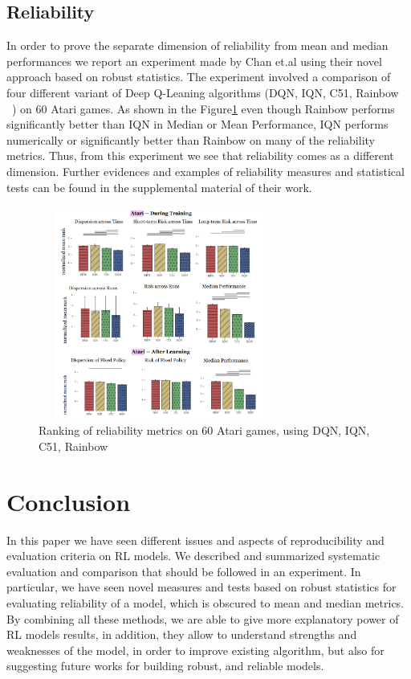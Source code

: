 \documentclass{article}
\begin{document}
\subsection{Reliability}
In order to prove the separate dimension of reliability from mean and median performances we report an experiment made by Chan et.al using their novel approach based on robust statistics. The experiment involved a comparison of four different variant of Deep Q-Leaning algorithms (DQN, IQN, C51, Rainbow ~\cite{DQN, IQN, C51,Rainbow}) on 60 Atari games. As shown in the Figure\ref{fig:realibility} even though Rainbow performs significantly better than IQN in Median or Mean Performance, IQN performs numerically or significantly better than Rainbow on many of the reliability metrics. Thus, from this experiment we see that reliability comes as a different dimension. Further evidences and examples of reliability measures and statistical tests can be found in the supplemental material of their work.
\begin{figure}[!htp]
	\centering
	\includegraphics[width=8cm, height=7cm]{./images/atari_ranking.png}
	\caption{Ranking of reliability metrics on 60 Atari games, using DQN, IQN, C51, Rainbow~\cite{GoogleMeasure}}
	\label{fig:realibility}
	\footnotesize{}
\end{figure}
\section{Conclusion}
In this paper we have seen different issues and aspects of reproducibility and evaluation criteria on RL models. We described and summarized systematic evaluation and comparison that should be followed in an experiment. In particular, we have seen novel measures and tests based on robust statistics for evaluating reliability of a model, which is obscured to mean and median metrics. By combining all these methods, we are able to give more explanatory power of RL models results, in addition, they allow to understand strengths and weaknesses of the model, in order to improve existing algorithm, but also for suggesting future works for building robust, and reliable models.
{\small
	
	
}

\appendix
\end{document}
